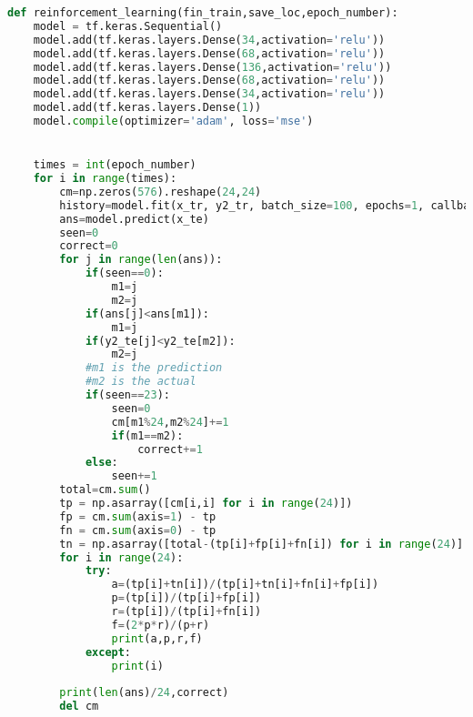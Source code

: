 \begin{lstlisting}[language=Python, caption=DQN, label={lst:DQN}]
def reinforcement_learning(fin_train,save_loc,epoch_number):
    model = tf.keras.Sequential()
    model.add(tf.keras.layers.Dense(34,activation='relu'))
    model.add(tf.keras.layers.Dense(68,activation='relu'))
    model.add(tf.keras.layers.Dense(136,activation='relu'))
    model.add(tf.keras.layers.Dense(68,activation='relu'))
    model.add(tf.keras.layers.Dense(34,activation='relu'))
    model.add(tf.keras.layers.Dense(1))
    model.compile(optimizer='adam', loss='mse')


    times = int(epoch_number)
    for i in range(times):    
        cm=np.zeros(576).reshape(24,24)
        history=model.fit(x_tr, y2_tr, batch_size=100, epochs=1, callbacks=[cp_callback])
        ans=model.predict(x_te)
        seen=0
        correct=0
        for j in range(len(ans)):
            if(seen==0):
                m1=j
                m2=j
            if(ans[j]<ans[m1]):
                m1=j
            if(y2_te[j]<y2_te[m2]):
                m2=j
            #m1 is the prediction
            #m2 is the actual
            if(seen==23):
                seen=0
                cm[m1%24,m2%24]+=1
                if(m1==m2):
                    correct+=1
            else:
                seen+=1
        total=cm.sum()
        tp = np.asarray([cm[i,i] for i in range(24)])
        fp = cm.sum(axis=1) - tp
        fn = cm.sum(axis=0) - tp
        tn = np.asarray([total-(tp[i]+fp[i]+fn[i]) for i in range(24)]
        for i in range(24):
            try:
                a=(tp[i]+tn[i])/(tp[i]+tn[i]+fn[i]+fp[i])
                p=(tp[i])/(tp[i]+fp[i])
                r=(tp[i])/(tp[i]+fn[i])
                f=(2*p*r)/(p+r)
                print(a,p,r,f)
            except:
                print(i)   
        
        print(len(ans)/24,correct)
        del cm
\end{lstlisting}

